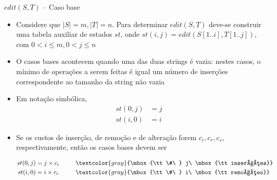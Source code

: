 \begin{frame}[fragile]{$edit(S, T)$ -- Caso base}

    \begin{itemize}
        \item Considere que $|S| = m, |T| = n$. Para determinar $edit(S, T)$ deve-se construir uma 
        tabela auxiliar de estados $st$, onde $st(i, j) = edit(S[1..i], T[1..j])$, com 
        $0 < i \leq m, 0 < j \leq n$

        \item O casos bases acontecem quando uma das duas strings é vazia: nestes casos, o mínimo 
            de operações a serem feitas é igual um número de inserções correspondente ao tamanho 
            da string não vazia

        \item Em notação simbólica,
        \begin{align*}
            st(0, j) &= j \\
            st(i, 0) &= i
        \end{align*}

        \item Se os custos de inserção, de remoção e de alteração forem $c_i, c_r, c_s$, 
            respectivamente, então os casos bases devem ser

        \begin{align*}
            st(0, j) &= j\times c_i \ \ \ \ \ \ \ \ \textcolor{gray}{\mbox{\tt \#\ } j\ \mbox{\tt inserções}}\\
            st(i, 0) &= i\times c_r \ \ \ \ \ \ \ \ \textcolor{gray}{\mbox{\tt \#\ } i\ \mbox{\tt remoções}}
        \end{align*}
    \end{itemize}

\end{frame}

